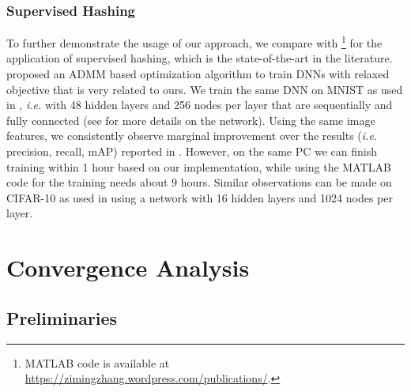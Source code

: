 \documentclass{article}
\providecommand{\SetAlgoLined}{\SetLine}
\def\ie{\emph{i.e. }}
\begin{document}
\subsubsection{Supervised Hashing}
To further demonstrate the usage of our approach, we compare with \cite{Zhang_2016_CVPR}\footnote{MATLAB code is available at \url{https://zimingzhang.wordpress.com/publications/}.} for the application of supervised hashing, which is the state-of-the-art in the literature. \cite{Zhang_2016_CVPR} proposed an ADMM based optimization algorithm to train DNNs with relaxed objective that is very related to ours. We train the same DNN on MNIST as used in \cite{Zhang_2016_CVPR}, \ie with 48 hidden layers and 256 nodes per layer that are sequentially and fully connected (see \cite{Zhang_2016_CVPR} for more details on the network). Using the same image features, we consistently observe marginal improvement over the results (\ie precision, recall, mAP) reported in \cite{Zhang_2016_CVPR}. However, on the same PC we can finish training within 1 hour based on our implementation, while using the MATLAB code for \cite{Zhang_2016_CVPR} the training needs about 9 hours. Similar observations can be made on CIFAR-10 as used in \cite{Zhang_2016_CVPR} using a network with 16 hidden layers and 1024 nodes per layer.


\section{Convergence Analysis}\label{sec:convergence}

\subsection{Preliminaries}\label{ssec:preliminaries}
		
			
			
\end{document}
